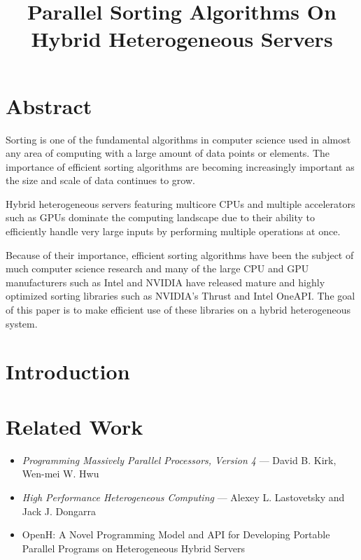 \documentclass[12pt,a4paper]{article}
\title{\textbf{Parallel Sorting Algorithms On Hybrid Heterogeneous Servers}}
\author{}
\date{}
\begin{document}
\maketitle
\tableofcontents
\newpage

\section*{Abstract}

Sorting is one of the fundamental algorithms in computer science used in almost any area of
computing with a large amount of data points or elements. The importance of efficient sorting
algorithms are becoming increasingly important as the size and scale of data continues to grow.

Hybrid heterogeneous servers featuring multicore CPUs and multiple accelerators such as GPUs
dominate the computing landscape due to their ability to efficiently handle very large inputs by
performing multiple operations at once.

Because of their importance, efficient sorting algorithms have been the subject of much computer
science research and many of the large CPU and GPU manufacturers such as Intel and NVIDIA
have released mature and highly optimized sorting libraries such as NVIDIA's Thrust and Intel
OneAPI. The goal of this paper is to make efficient use of these libraries on a hybrid heterogeneous
system.

\section{Introduction}


\section{Related Work}

\begin{itemize}
    \item \textit{Programming Massively Parallel Processors, Version 4} --- David B. Kirk, Wen-mei W. Hwu
    \item \textit{High Performance Heterogeneous Computing} --- Alexey L. Lastovetsky and Jack J. Dongarra
    \item OpenH: A Novel Programming Model and API for Developing Portable Parallel Programs on
          Heterogeneous Hybrid Servers \cite{farrelly2024}
\end{itemize}
\end{document}
